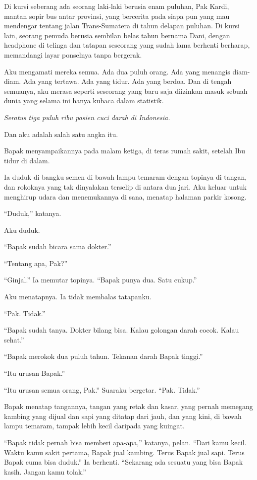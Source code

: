 \documentclass[11pt,twoside,openany]{book}
\makeatletter
\newcommand{\scenebreak}{\par\vspace{0.9em}{\centering\textsc{*\hspace{0.7em}*\hspace{0.7em}*}\par}\vspace{0.9em}\@afterindentfalse\@afterheading}
\makeatother
\begin{document}
Di kursi seberang ada seorang laki-laki berusia enam puluhan, Pak Kardi, mantan sopir bus antar provinsi, yang bercerita pada siapa pun yang mau mendengar tentang jalan Trans-Sumatera di tahun delapan puluhan. Di kursi lain, seorang pemuda berusia sembilan belas tahun bernama Dani, dengan headphone di telinga dan tatapan seseorang yang sudah lama berhenti berharap, memandangi layar ponselnya tanpa bergerak.

Aku mengamati mereka semua. Ada dua puluh orang. Ada yang menangis diam-diam. Ada yang tertawa. Ada yang tidur. Ada yang berdoa. Dan di tengah semuanya, aku merasa seperti seseorang yang baru saja diizinkan masuk sebuah dunia yang selama ini hanya kubaca dalam statistik.

\emph{Seratus tiga puluh ribu pasien cuci darah di Indonesia.}

Dan aku adalah salah satu angka itu.

\scenebreak
Bapak menyampaikannya pada malam ketiga, di teras rumah sakit, setelah Ibu tidur di dalam.

Ia duduk di bangku semen di bawah lampu temaram dengan topinya di tangan, dan rokoknya yang tak dinyalakan terselip di antara dua jari. Aku keluar untuk menghirup udara dan menemukannya di sana, menatap halaman parkir kosong.

``Duduk,'' katanya.

Aku duduk.

``Bapak sudah bicara sama dokter.''

``Tentang apa, Pak?''

``Ginjal.'' Ia memutar topinya. ``Bapak punya dua. Satu cukup.''

Aku menatapnya. Ia tidak membalas tatapanku.

``Pak. Tidak.''

``Bapak sudah tanya. Dokter bilang bisa. Kalau golongan darah cocok. Kalau sehat.''

``Bapak merokok dua puluh tahun. Tekanan darah Bapak tinggi.''

``Itu urusan Bapak.''

``Itu urusan semua orang, Pak.'' Suaraku bergetar. ``Pak. Tidak.''

Bapak menatap tangannya, tangan yang retak dan kasar, yang pernah memegang kambing yang dijual dan sapi yang ditatap dari jauh, dan yang kini, di bawah lampu temaram, tampak lebih kecil daripada yang kuingat.

``Bapak tidak pernah bisa memberi apa-apa,'' katanya, pelan. ``Dari kamu kecil. Waktu kamu sakit pertama, Bapak jual kambing. Terus Bapak jual sapi. Terus Bapak cuma bisa duduk.'' Ia berhenti. ``Sekarang ada sesuatu yang bisa Bapak kasih. Jangan kamu tolak.''
\end{document}
